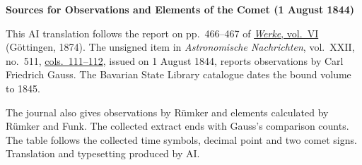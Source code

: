 \clearpage\thispagestyle{empty}
\begin{center}\textbf{Sources for Observations and Elements of the Comet (1 August 1844)}\end{center}
\noindent This AI translation follows the report on pp.~466--467 of \href{https://gdz.sub.uni-goettingen.de/id/PPN236007467}{\textit{Werke}, vol.~VI} (Göttingen, 1874). The unsigned item in \textit{Astronomische Nachrichten}, vol.~XXII, no.~511, \href{https://api.digitale-sammlungen.de/iiif/image/v2/bsb10049447_00064/full/1800,/0/default.jpg}{cols.~111--112}, issued on 1 August 1844, reports observations by Carl Friedrich Gauss. The Bavarian State Library catalogue dates the bound volume to 1845.
\par\smallskip\noindent The journal also gives observations by Rümker and elements calculated by Rümker and Funk. The collected extract ends with Gauss’s comparison counts. The table follows the collected time symbols, decimal point and two comet signs. Translation and typesetting produced by AI.
\clearpage
